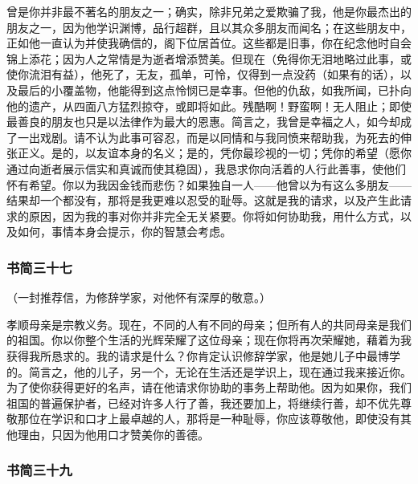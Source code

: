 曾是你并非最不著名的朋友之一；确实，除非兄弟之爱欺骗了我，他是你最杰出的朋友之一，因为他学识渊博，品行超群，且以其众多朋友而闻名；在这些朋友中，正如他一直认为并使我确信的，阁下位居首位。这些都是旧事，你在纪念他时自会锦上添花；因为人之常情是为逝者增添赞美。但现在（免得你无泪地略过此事，或使你流泪有益），他死了，无友，孤单，可怜，仅得到一点没药（如果有的话），以及最后的小覆盖物，他能得到这点怜悯已是幸事。但他的仇敌，如我所闻，已扑向他的遗产，从四面八方猛烈掠夺，或即将如此。残酷啊！野蛮啊！无人阻止；即使最善良的朋友也只是以法律作为最大的恩惠。简言之，我曾是幸福之人，如今却成了一出戏剧。请不认为此事可容忍，而是以同情和与我同愤来帮助我，为死去的伸张正义。是的，以友谊本身的名义；是的，凭你最珍视的一切；凭你的希望（愿你通过向逝者展示信实和真诚而使其稳固），我恳求你向活着的人行此善事，使他们怀有希望。你以为我因金钱而悲伤？如果独自一人——他曾以为有这么多朋友——结果却一个都没有，那将是我更难以忍受的耻辱。这就是我的请求，以及产生此请求的原因，因为我的事对你并非完全无关紧要。你将如何协助我，用什么方式，以及如何，事情本身会提示，你的智慧会考虑。\par


\subsubsection{书简三十七}

（一封推荐信，为修辞学家，对他怀有深厚的敬意。）\par

孝顺母亲是宗教义务。现在，不同的人有不同的母亲；但所有人的共同母亲是我们的祖国。你以你整个生活的光辉荣耀了这位母亲；现在你将再次荣耀她，藉着为我获得我所恳求的。我的请求是什么？你肯定认识修辞学家，他是她儿子中最博学的。简言之，他的儿子，另一个，无论在生活还是学识上，现在通过我来接近你。为了使你获得更好的名声，请在他请求你协助的事务上帮助他。因为如果你，我们祖国的普遍保护者，已经对许多人行了善，我还要加上，将继续行善，却不优先尊敬那位在学识和口才上最卓越的人，那将是一种耻辱，你应该尊敬他，即使没有其他理由，只因为他用口才赞美你的善德。\par


\subsubsection{书简三十九}

